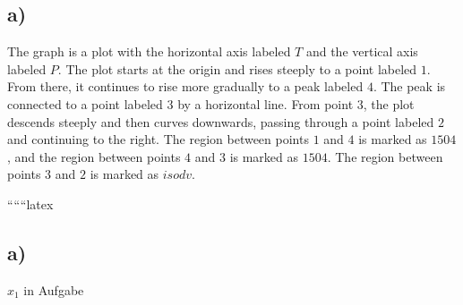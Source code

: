 

\subsection*{a)}

The graph is a plot with the horizontal axis labeled \( T \) and the vertical axis labeled \( P \). The plot starts at the origin and rises steeply to a point labeled \( 1 \). From there, it continues to rise more gradually to a peak labeled \( 4 \). The peak is connected to a point labeled \( 3 \) by a horizontal line. From point \( 3 \), the plot descends steeply and then curves downwards, passing through a point labeled \( 2 \) and continuing to the right. The region between points \( 1 \) and \( 4 \) is marked as \( 1504 \), and the region between points \( 4 \) and \( 3 \) is marked as \( 1504 \). The region between points \( 3 \) and \( 2 \) is marked as \( isodv \).

``````latex



\subsection*{a)}
$x_1$ in Aufgabe